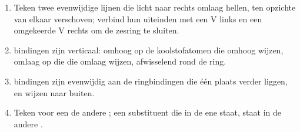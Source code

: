 \begin{method}\label{met:b1:stereochemistry-in-depth:draw-chair}
\begin{enumerate}
  \item Teken twee evenwijdige lijnen die licht naar rechts omlaag
        hellen, ten opzichte van elkaar verschoven; verbind hun uiteinden
        met een V links en een omgekeerde V rechts om de zesring te
        sluiten.
  \item {} bindingen zijn verticaal: omhoog op de koolstofatomen die
        omhoog wijzen, omlaag op die die omlaag wijzen, afwisselend rond
        de ring.
  \item {} bindingen zijn evenwijdig aan de ringbindingen die één
        plaats verder liggen, en wijzen naar buiten.
  \item Teken voor een  de andere ; een substituent die in de
        ene  staat, staat in de andere .
\end{enumerate}
\end{method}

